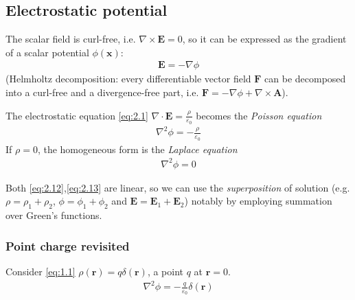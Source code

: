 \documentclass[a4paper]{article}
\begin{document}
\subsection{Electrostatic potential}
The scalar field is curl-free, i.e. $\nabla \times \mathbf{E} = 0$, so it can be expressed as the gradient of a scalar potential $\phi(\mathbf{x})$:
\begin{equation*}\tag{2.11} \label{eq:2.11}
\begin{aligned}
\mathbf{E} = -\nabla \phi
\end{aligned}
\end{equation*}
(Helmholtz decomposition: every differentiable vector field $\mathbf{F}$ can be decomposed into a curl-free and a divergence-free part, i.e. $\mathbf{F} = -\nabla \phi + \nabla \times \mathbf{A}$).

The electrostatic equation \eqref{eq:2.1} $\nabla \cdot \mathbf{E} = \frac{\rho}{\varepsilon_0}$ becomes the \emph{Poisson equation}
\begin{equation*}\tag{2.12} \label{eq:2.12}
\begin{aligned}
\nabla^2 \phi = -\frac{\rho}{\varepsilon_0}
\end{aligned}
\end{equation*}
If $\rho = 0$, the homogeneous form is the \emph{Laplace equation}
\begin{equation*}\tag{2.13} \label{eq:2.13}
\begin{aligned}
\nabla^2 \phi = 0
\end{aligned}
\end{equation*}

Both \eqref{eq:2.12},\eqref{eq:2.13} are linear, so we can use the \emph{superposition} of solution (e.g. $\rho = \rho_1+\rho_2$, $\phi = \phi_1 + \phi_2$ and $\mathbf{E} = \mathbf{E}_1+\mathbf{E}_2$) notably by employing summation over Green's functions.

\subsubsection{Point charge revisited}
Consider \eqref{eq:1.1} $\rho(\mathbf{r}) = q\delta (\mathbf{r})$, a point $q$ at $\mathbf{r} = 0$.
\begin{equation*}\tag{2.14} \label{eq:2.14}
\begin{aligned}
\nabla^2 \phi = -\frac{q}{\varepsilon_0} \delta(\mathbf{r})
\end{aligned}
\end{equation*}
\end{document}
